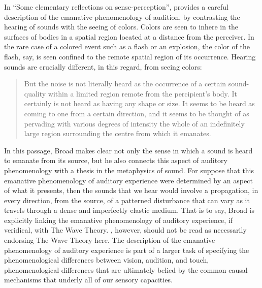 In ``Some elementary reflections on sense-perception'', \citet{Broad:1952kx} provides a careful description of the emanative phenomenology of audition, by contrasting the hearing of sounds with the seeing of colors. Colors are seen to inhere in the surfaces of bodies in a spatial region located at a distance from the perceiver. In the rare case of a colored event such as a flash or an explosion, the color of the flash, say, is seen confined to the remote spatial region of its occurrence. Hearing sounds are crucially different, in this regard, from seeing colors:
\begin{quote}
	But the noise is not literally heard as the occurrence of a certain sound-quality within a limited region remote from the percipient's body. It certainly is not heard as having any shape or size. It seems to be heard as coming to one from a certain direction, and it seems to be thought of as pervading with various degrees of intensity the whole of an indefinitely large region surrounding the centre from which it emanates. \citep[5]{Broad:1952kx}
\end{quote}
In this passage, Broad makes clear not only the sense in which a sound is heard to emanate from its source, but he also connects this aspect of auditory phenomenology with a thesis in the metaphysics of sound. For suppose that this emanative phenomenology of auditory experience were determined by an aspect of what it presents, then the sounds that we hear would involve a propagation, in every direction, from the source, of a patterned disturbance that can vary as it travels through a dense and imperfectly elastic medium. That is to say, Broad is explicitly linking the emanative phenomenology of auditory experience, if veridical, with The Wave Theory. \citet{Broad:1952kx}, however, should not be read as necessarily endorsing The Wave Theory here. The description of the emanative phenomenology of auditory experience is part of a larger task of specifying the phenomenological differences between vision, audition, and touch, phenomenological differences that are ultimately belied by the common causal mechanisms that underly all of our sensory capacities.

